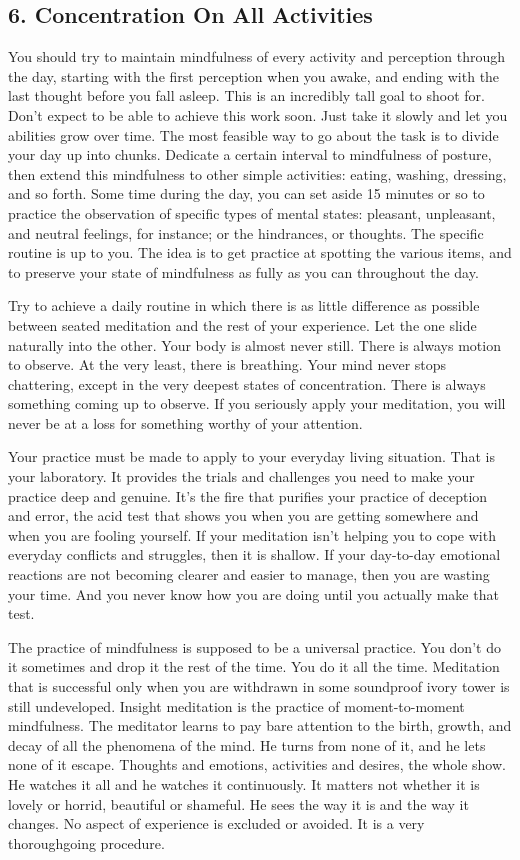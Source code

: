 \subsection*{6. Concentration On All Activities}
You should try to maintain mindfulness of
every activity and perception through the day, starting with the first
perception when you awake, and ending with the last thought before you fall
asleep. This is an incredibly tall goal to shoot for. Don't expect to be able to
achieve this work soon. Just take it slowly and let you abilities grow over
time. The most feasible way to go about the task is to divide your day up into
chunks. Dedicate a certain interval to mindfulness of posture, then extend this
mindfulness to other simple activities: eating, washing, dressing, and so forth.
Some time during the day, you can set aside 15 minutes or so to practice the
observation of specific types of mental states: pleasant, unpleasant, and
neutral feelings, for instance; or the hindrances, or thoughts. The specific
routine is up to you. The idea is to get practice at spotting the various items,
and to preserve your state of mindfulness as fully as you can throughout the
day.

Try to achieve a daily routine in which there is as little difference as
possible between seated meditation and the rest of your experience. Let the one
slide naturally into the other. Your body is almost never still. There is always
motion to observe. At the very least, there is breathing. Your mind never stops
chattering, except in the very deepest states of concentration. There is always
something coming up to observe. If you seriously apply your meditation, you will
never be at a loss for something worthy of your attention.

Your practice must be made to apply to your everyday living situation. That is
your laboratory. It provides the trials and challenges you need to make your
practice deep and genuine. It's the fire that purifies your practice of
deception and error, the acid test that shows you when you are getting somewhere
and when you are fooling yourself. If your meditation isn't helping you to cope
with everyday conflicts and struggles, then it is shallow. If your day-to-day
emotional reactions are not becoming clearer and easier to manage, then you are
wasting your time. And you never know how you are doing until you actually make
that test.

The practice of mindfulness is supposed to be a universal practice. You don't do
it sometimes and drop it the rest of the time. You do it all the time.
Meditation that is successful only when you are withdrawn in some soundproof
ivory tower is still undeveloped. Insight meditation is the practice of
moment-to-moment mindfulness. The meditator learns to pay bare attention to the
birth, growth, and decay of all the phenomena of the mind. He turns from none of
it, and he lets none of it escape. Thoughts and emotions, activities and
desires, the whole show. He watches it all and he watches it continuously. It
matters not whether it is lovely or horrid, beautiful or shameful. He sees the
way it is and the way it changes. No aspect of experience is excluded or
avoided. It is a very thoroughgoing procedure.


